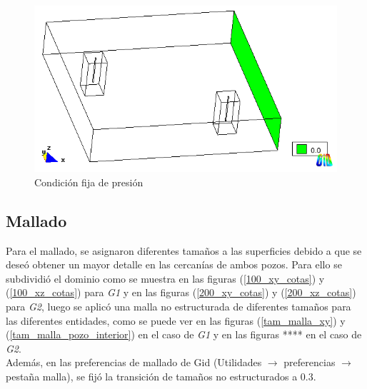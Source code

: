 \documentclass[10pt,a4paper,final]{article}
\begin{document}
\begin{figure}[tbhp]
\centerline{\includegraphics[scale=0.75]{img/100m/100_condiciones_presion0}}
\caption{Condición fija de presión}
\label{100_condiciones_presion0}
\end{figure}
\subsection{Mallado}
Para el mallado, se asignaron diferentes tamaños a las superficies debido a que se deseó obtener un mayor detalle en las cercanías de ambos pozos. Para ello se subdividió el dominio como se muestra en las figuras (\ref{100_xy_cotas}) y (\ref{100_xz_cotas}) para \emph{G1} y en las figuras (\ref{200_xy_cotas}) y (\ref{200_xz_cotas}) para \emph{G2}, luego se aplicó una malla no estructurada de diferentes tamaños para las diferentes entidades, como se puede ver en las figuras (\ref{tam_malla_xy}) y (\ref{tam_malla_pozo_interior}) en el caso de \emph{G1} y en las figuras **** en el caso de \emph{G2}. 
\\
Además, en las preferencias de mallado de Gid (Utilidades $\rightarrow$ preferencias $\rightarrow$ pestaña malla), se fijó la transición de tamaños no estructurados a $0.3$.

\end{document}
